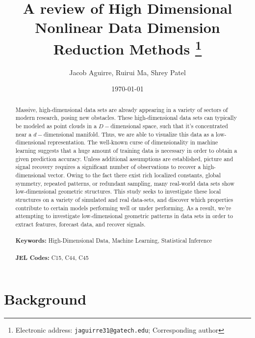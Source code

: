 \documentclass[12pt]{article}
\begin{document}
\begin{titlepage}
\title{A review of High Dimensional Nonlinear Data Dimension Reduction Methods
\thanks{Electronic address: \texttt{jaguirre31@gatech.edu}; Corresponding author}}
\author{Jacob Aguirre, Ruirui Ma, Shrey Patel}
\date{\today}
\maketitle
\begin{abstract}
\noindent Massive, high-dimensional data sets are already appearing in a variety of sectors of modern research, posing new obstacles. These high-dimensional data sets can typically be modeled as point clouds in a $D-$dimensional space, such that it's concentrated near a $d-$dimensional manifold. Thus, we are able to visualize this data as a low-dimensional representation. The well-known curse of dimensionality in machine learning suggests that a huge amount of training data is necessary in order to obtain a given prediction accuracy. Unless additional assumptions are established, picture and signal recovery requires a significant number of observations to recover a high-dimensional vector. Owing to the fact there exist rich localized constants, global symmetry, repeated patterns, or redundant sampling, many real-world data sets show low-dimensional geometric structures. This study seeks to investigate these local structures on a variety of simulated and real data-sets, and discover which properties contribute to certain models performing well or under performing. As a result, we're attempting to investigate low-dimensional geometric patterns in data sets in order to extract features, forecast data, and recover signals.  \\
\vspace{0in}\\
\noindent\textbf{Keywords:} High-Dimensional Data, Machine Learning, Statistical Inference\\
\vspace{0in}\\
\noindent\textbf{JEL Codes:} C15, C44, C45\\

\bigskip
\end{abstract}
\setcounter{page}{0}
\thispagestyle{empty}
\end{titlepage}
\pagebreak \newpage




\doublespacing


\section{Background} \label{sec:introduction}
\end{document}
